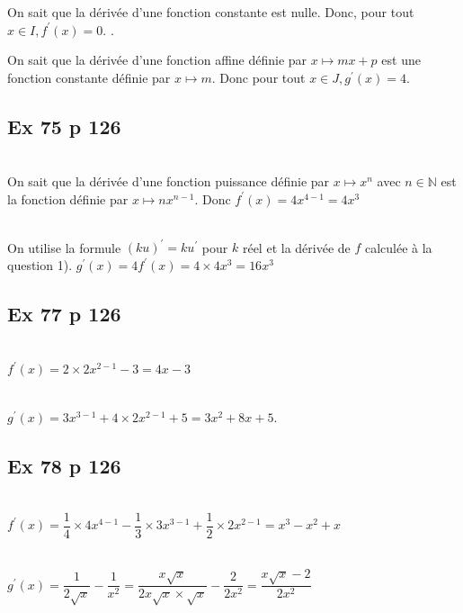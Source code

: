 \documentclass[12pt,a4paper]{book}
\begin{document}
\begin{enumMet}
    \item On sait que la dérivée d'une fonction constante est nulle. Donc, pour tout $x \in I, f^{\prime}(x)=0$. .
    \item On sait que la dérivée d'une fonction affine définie par $x \mapsto m x+p$ est une fonction constante définie par $x \mapsto m$. Donc pour tout $x \in J, g^{\prime}(x)=4$.
\end{enumMet}

\subsection*{Ex 75 p 126}

\begin{enumMet}
    \item {}\\
On sait que la dérivée d'une fonction puissance définie par $x \mapsto x^{n}$ avec $n \in \mathbb{N}$ est la fonction définie par $x \mapsto n x^{n-1}$. Donc $f^{\prime}(x)=4 x^{4-1}=4 x^{3}$
    \item {}\\
    On utilise la formule $(k u)^{\prime}=k u^{\prime}$ pour $k$ réel et la dérivée de $f$ calculée à la question 1). $g^{\prime}(x)=4 f^{\prime}(x)=4 \times 4 x^{3}=16 x^{3}$
\end{enumMet}

\subsection*{Ex 77 p 126}
\begin{enumMet}
    \item {}\\
    $f^{\prime}(x)=2 \times 2 x^{2-1}-3=4 x-3$
    \item {}\\
    $g^{\prime}(x)=3 x^{3-1}+4 \times 2 x^{2-1}+5=3 x^{2}+8 x+5$.
\end{enumMet}

\subsection*{Ex 78 p 126}
\begin{enumMet}
    \item {}\\
    $f^{\prime}(x)=\dfrac{1}{4} \times 4 x^{4-1}-\dfrac{1}{3} \times 3 x^{3-1}+\dfrac{1}{2} \times 2 x^{2-1}=x^{3}-x^{2}+x$
    \item {}\\
    $g^{\prime}(x)=\dfrac{1}{2 \sqrt{x}}-\dfrac{1}{x^{2}}=\dfrac{x \sqrt{x}}{2 x \sqrt{x} \times \sqrt{x}}-\dfrac{2}{2 x^{2}}=\dfrac{x \sqrt{x}-2}{2 x^{2}}$
\end{enumMet}
\end{document}
